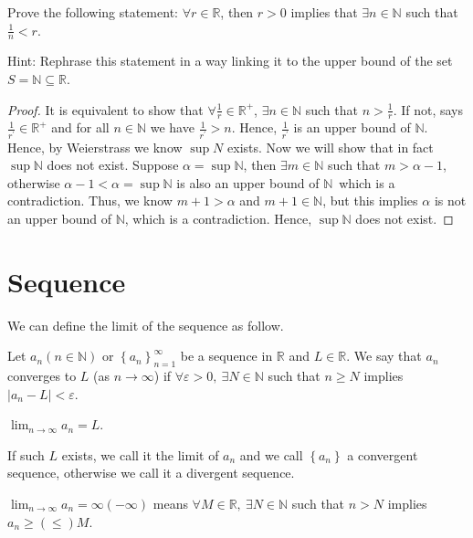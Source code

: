 \begin{theorem}\label{thm: Archimedean}
	Prove the following statement: \(\forall r \in \mathbb{R} \), then \(r > 0\) implies that \(\exists n \in \mathbb{N} \) such that \(\frac{1}{n} < r\).    

	Hint: Rephrase this statement in a way linking it to the upper bound of the set \(S = \mathbb{N} \subseteq \mathbb{R}\).
\end{theorem}
\begin{proof}
	It is equivalent to show that \(\forall \frac{1}{r} \in \mathbb{R} ^+\), \(\exists n \in \mathbb{N} \) such that \(n > \frac{1}{r}\). If not, says \(\frac{1}{r^{\prime} } \in \mathbb{R} ^+\) and for all \(n \in \mathbb{N} \) we have \(\frac{1}{r^{\prime} } > n\). Hence, \(\frac{1}{r^{\prime} }\) is an upper bound of \(\mathbb{N} \). Hence, by Weierstrass we know \(\sup N\) exists. Now we will show that in fact \(\sup \mathbb{N} \) does not exist. Suppose \(\alpha = \sup \mathbb{N} \), then \(\exists m \in \mathbb{N} \) such that \(m > \alpha - 1\), otherwise \(\alpha - 1 < \alpha = \sup \mathbb{N}  \) is also an upper bound of \(\mathbb{N} \)\, which is a contradiction. Thus, we know \(m + 1 > \alpha \) and \(m + 1 \in \mathbb{N} \), but this implies \(\alpha \) is not an upper bound of \(\mathbb{N} \), which is a contradiction. Hence, \(\sup \mathbb{N} \) does not exist.                    
\end{proof}
\section{Sequence}
\begin{definition*}
	We can define the limit of the sequence as follow.
\begin{definition}
		Let \(a_n (n \in \mathbb{N} )\) or \(\left\{ a_n \right\}_{n=1}^{\infty}  \) be a sequence in \(\mathbb{R} \) and \(L \in \mathbb{R} \). We say that \(a_n\) converges to \(L\) (as \(n \to \infty \)) if \(\forall \varepsilon > 0, \ \exists N \in \mathbb{N} \) such that \(n \ge N\) implies \(\left\vert a_n - L \right\vert < \varepsilon  \). 
\end{definition}    

\begin{notation}
	\(\lim_{n \to \infty} a_n = L \). 
\end{notation}

\begin{note}
	If such \(L\) exists, we call it the limit of \(a_n\) and we call \(\left\{ a_n \right\} \) a convergent sequence, otherwise we call it a divergent sequence.   
\end{note}

\begin{definition}
	\(\lim_{n \to \infty} a_n = \infty (-\infty )  \) means \(\forall M \in \mathbb{R} , \ \exists N \in \mathbb{N} \) such that \(n > N\) implies \(a_n \ge (\le) M\).  
\end{definition}
\end{definition*}

